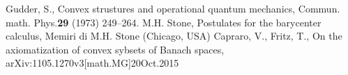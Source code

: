 \documentclass[12pt,letterpaper]{article}
\begin{document}
\begin{thebibliography}{WWW}
 Gudder, S., Convex strustures and operational quantum mechanics, Commun. math. Phys.{\bf 29} (1973) 249--264.
 M.H. Stone, Postulates for the barycenter calculus, Memiri di M.H. Stone (Chicago, USA)
 Capraro, V., Fritz, T., On the axiomatization of convex sybsets of Banach spaces, arXiv:1105.1270v3[math.MG]20Oct.2015
\end{thebibliography}
\end{document}
